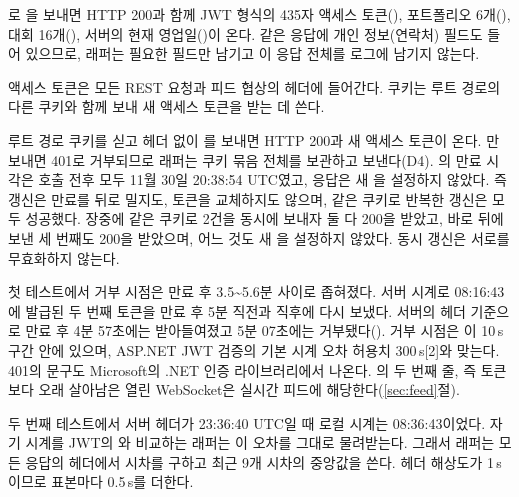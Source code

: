 \seclabel
{}

 로 을 보내면 HTTP 200과 함께 JWT 형식의 435자 액세스 토큰(), 포트폴리오 6개(), 대회 16개(), 서버의 현재 영업일()이 온다. 같은 응답에 개인 정보(연락처) 필드도 들어 있으므로, 래퍼는 필요한 필드만 남기고 이 응답 전체를 로그에 남기지 않는다.

 액세스 토큰은 모든 REST 요청과 피드 협상의  헤더에 들어간다.  쿠키는 루트 경로의 다른 쿠키와 함께 보내 새 액세스 토큰을 받는 데 쓴다.



 루트 경로 쿠키를 싣고  헤더 없이 를 보내면 HTTP 200과 새 액세스 토큰이 온다. 만 보내면 401로 거부되므로 래퍼는 쿠키 묶음 전체를 보관하고 보낸다(D4). 의 만료 시각은 호출 전후 모두 11월 30일 20:38:54 UTC였고, 응답은 새 을 설정하지 않았다. 즉 갱신은 만료를 뒤로 밀지도, 토큰을 교체하지도 않으며, 같은 쿠키로 반복한 갱신은 모두 성공했다. 장중에 같은 쿠키로  2건을 동시에 보내자 둘 다 200을 받았고, 바로 뒤에 보낸 세 번째도 200을 받았으며, 어느 것도 새 을 설정하지 않았다. 동시 갱신은 서로를 무효화하지 않는다.

 첫 테스트에서 거부 시점은 만료 후 3.5\textasciitilde 5.6분 사이로 좁혀졌다. 서버 시계로 08:16:43에 발급된 두 번째 토큰을 만료 후 5분 직전과 직후에 다시 보냈다. 서버의  헤더 기준으로 만료 후 4분 57초에는 받아들여졌고 5분 07초에는 거부됐다(). 거부 시점은 이 10\,s 구간 안에 있으며, ASP.NET JWT 검증의 기본 시계 오차 허용치 300\,s[2]와 맞는다. 401의 문구도 Microsoft의 .NET 인증 라이브러리에서 나온다. 의 두 번째 줄, 즉 토큰보다 오래 살아남은 열린 WebSocket은 실시간 피드에 해당한다(\ref{sec:feed}절).



 두 번째 테스트에서 서버  헤더가 23:36:40 UTC일 때 로컬 시계는 08:36:43이었다. 자기 시계를 JWT의 와 비교하는 래퍼는 이 오차를 그대로 물려받는다. 그래서 래퍼는 모든 응답의  헤더에서 시차를 구하고 최근 9개 시차의 중앙값을 쓴다. 헤더 해상도가 1\,s이므로 표본마다 0.5\,s를 더한다.

